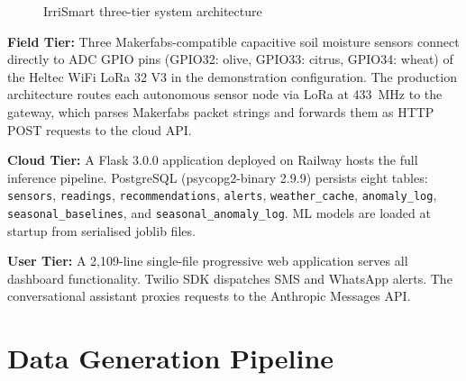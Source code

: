 \documentclass[12pt,a4paper]{report}
\begin{document}
\begin{figure}[H]
{%
}%
\caption{IrriSmart three-tier system architecture}
\label{fig:architecture}
\end{figure}

\textbf{Field Tier:} Three Makerfabs-compatible capacitive soil moisture sensors connect directly to ADC GPIO pins (GPIO32: olive, GPIO33: citrus, GPIO34: wheat) of the Heltec WiFi LoRa 32 V3 in the demonstration configuration. The production architecture routes each autonomous sensor node via LoRa at 433~MHz to the gateway, which parses Makerfabs packet strings and forwards them as HTTP POST requests to the cloud API.

\textbf{Cloud Tier:} A Flask 3.0.0 application deployed on Railway hosts the full inference pipeline. PostgreSQL (psycopg2-binary 2.9.9) persists eight tables: \texttt{sensors}, \texttt{readings}, \texttt{recommendations}, \texttt{alerts}, \texttt{weather\_cache}, \texttt{anomaly\_log}, \texttt{seasonal\_baselines}, and \texttt{seasonal\_anomaly\_log}. ML models are loaded at startup from serialised joblib files.

\textbf{User Tier:} A 2,109-line single-file progressive web application serves all dashboard functionality. Twilio SDK dispatches SMS and WhatsApp alerts. The conversational assistant proxies requests to the Anthropic Messages API.

\section{Data Generation Pipeline}
\end{document}

